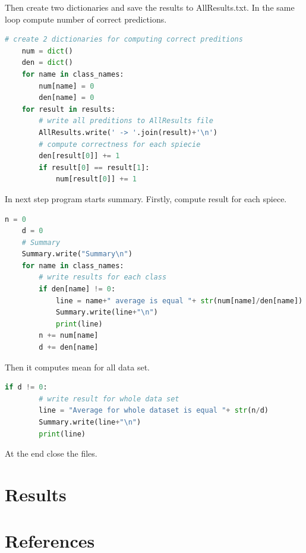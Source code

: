 \documentclass[12pt]{article}
\begin{document}
Then create two dictionaries and save the results to AllResults.txt. In the same loop compute number of correct predictions.

\begin{lstlisting}[language=Python]
# create 2 dictionaries for computing correct preditions
    num = dict()
    den = dict()
    for name in class_names:
        num[name] = 0
        den[name] = 0
    for result in results:
        # write all preditions to AllResults file
        AllResults.write(' -> '.join(result)+'\n')
        # compute correctness for each spiecie
        den[result[0]] += 1
        if result[0] == result[1]:
            num[result[0]] += 1
\end{lstlisting} 

In next step program starts summary. Firstly, compute result for each spiece.

\begin{lstlisting}[language=Python]
n = 0
    d = 0
    # Summary
    Summary.write("Summary\n")
    for name in class_names:
        # write results for each class
        if den[name] != 0:
            line = name+" average is equal "+ str(num[name]/den[name])
            Summary.write(line+"\n")        
            print(line)
        n += num[name]
        d += den[name]
\end{lstlisting} 

Then it computes mean for all data set.

\begin{lstlisting}[language=Python]
 if d != 0:
        # write result for whole data set
        line = "Average for whole dataset is equal "+ str(n/d)
        Summary.write(line+"\n")        
        print(line)
\end{lstlisting} 

At the end close the files.

\section{Results}

\section{References}
\end{document}
